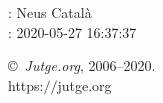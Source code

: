 \documentclass[11pt]{article}
\begin{document}
    \newcommand{\SampleTwoCol}{\SampleTwoColInputOutput{sample1}{1}\SampleTwoColInputOutput{sample2}{2}\SampleTwoColInputOutput{sample3}{3}}
    \newcommand{\SampleOneCol}{\SampleOneColInputOutput{sample1}{1}\SampleOneColInputOutput{sample2}{2}\SampleOneColInputOutput{sample3}{3}}

    \ProblemInformation
    \Author: Neus Català\\    
    \Generation: 2020-05-27 16:37:37

    \bigskip

    \copyright\ \emph{Jutge.org}, 2006--2020. \\
    https:$/\!\!/$jutge.org
\end{document}
